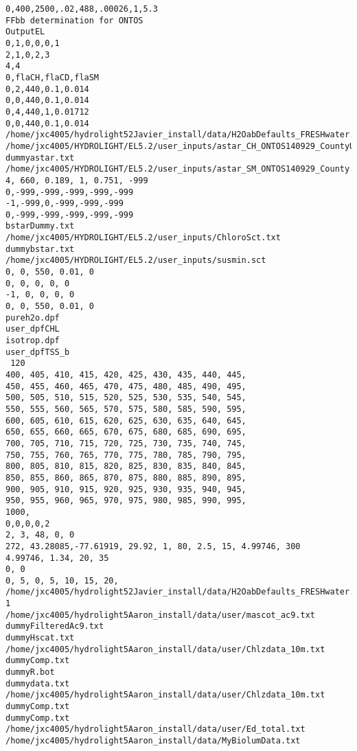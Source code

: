 \begin{appendices}
\singlespacing
{}
\renewcommand{\lstlistingname}{Code}
\begin{lstlisting}
0,400,2500,.02,488,.00026,1,5.3
FFbb determination for ONTOS
OutputEL
0,1,0,0,0,1
2,1,0,2,3
4,4
0,flaCH,flaCD,flaSM
0,2,440,0.1,0.014
0,0,440,0.1,0.014
0,4,440,1,0.01712
0,0,440,0.1,0.014
/home/jxc4005/hydrolight52Javier_install/data/H2OabDefaults_FRESHwater.txt
/home/jxc4005/HYDROLIGHT/EL5.2/user_inputs/astar_CH_ONTOS140929_CountyUncorr.txt
dummyastar.txt
/home/jxc4005/HYDROLIGHT/EL5.2/user_inputs/astar_SM_ONTOS140929_County.txt
4, 660, 0.189, 1, 0.751, -999
0,-999,-999,-999,-999,-999
-1,-999,0,-999,-999,-999
0,-999,-999,-999,-999,-999
bstarDummy.txt
/home/jxc4005/HYDROLIGHT/EL5.2/user_inputs/ChloroSct.txt
dummybstar.txt
/home/jxc4005/HYDROLIGHT/EL5.2/user_inputs/susmin.sct
0, 0, 550, 0.01, 0
0, 0, 0, 0, 0
-1, 0, 0, 0, 0
0, 0, 550, 0.01, 0
pureh2o.dpf
user_dpfCHL
isotrop.dpf
user_dpfTSS_b
 120
400, 405, 410, 415, 420, 425, 430, 435, 440, 445,
450, 455, 460, 465, 470, 475, 480, 485, 490, 495,
500, 505, 510, 515, 520, 525, 530, 535, 540, 545,
550, 555, 560, 565, 570, 575, 580, 585, 590, 595,
600, 605, 610, 615, 620, 625, 630, 635, 640, 645,
650, 655, 660, 665, 670, 675, 680, 685, 690, 695,
700, 705, 710, 715, 720, 725, 730, 735, 740, 745,
750, 755, 760, 765, 770, 775, 780, 785, 790, 795,
800, 805, 810, 815, 820, 825, 830, 835, 840, 845,
850, 855, 860, 865, 870, 875, 880, 885, 890, 895,
900, 905, 910, 915, 920, 925, 930, 935, 940, 945,
950, 955, 960, 965, 970, 975, 980, 985, 990, 995,
1000,
0,0,0,0,2
2, 3, 48, 0, 0
272, 43.28085,-77.61919, 29.92, 1, 80, 2.5, 15, 4.99746, 300
4.99746, 1.34, 20, 35
0, 0
0, 5, 0, 5, 10, 15, 20, 
/home/jxc4005/hydrolight52Javier_install/data/H2OabDefaults_FRESHwater.txt
1
/home/jxc4005/hydrolight5Aaron_install/data/user/mascot_ac9.txt
dummyFilteredAc9.txt
dummyHscat.txt
/home/jxc4005/hydrolight5Aaron_install/data/user/Chlzdata_10m.txt
dummyComp.txt
dummyR.bot
dummydata.txt
/home/jxc4005/hydrolight5Aaron_install/data/user/Chlzdata_10m.txt
dummyComp.txt
dummyComp.txt
/home/jxc4005/hydrolight5Aaron_install/data/user/Ed_total.txt
/home/jxc4005/hydrolight5Aaron_install/data/MyBiolumData.txt
\end{lstlisting}

\end{appendices}